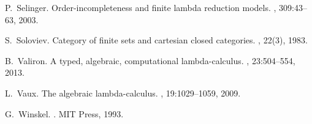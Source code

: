 \documentclass[10pt]{article}
\theoremstyle{plain}
\theoremstyle{definition}
\begin{document}
\begin{thebibliography}{10}
P.~Selinger.
\newblock Order-incompleteness and finite lambda reduction models.
, 309:43--63, 2003.

S.~Soloviev.
\newblock Category of finite sets and cartesian closed categories.
, 22(3), 1983.

B.~Valiron.
\newblock A typed, algebraic, computational lambda-calculus.
, 23:504--554, 2013.

L.~Vaux.
\newblock The algebraic lambda-calculus.
, 19:1029--1059, 2009.

G.~Winskel.
.
\newblock MIT Press, 1993.

\end{thebibliography}
\end{document}
